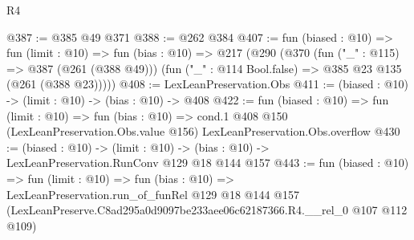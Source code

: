 \begin{lexlean}{R4}
\begin{coremodule}
@387 := @385 @49 @371
@388 := @262 @384
@407 := fun (biased : @10) =>
  fun (limit : @10) =>
  fun (bias : @10) =>
  @217
    (@290
      (@370
        (fun ("_" : @115) => @387 (@261 (@388 @49)))
        (fun ("_" : @114 Bool.false) => @385 @23 @135 (@261 (@388 @23)))))
@408 := LexLeanPreservation.Obs
@411 := (biased : @10) -> (limit : @10) -> (bias : @10) -> @408
@422 := fun (biased : @10) =>
  fun (limit : @10) =>
  fun (bias : @10) =>
  cond.{1} @408 @150 (LexLeanPreservation.Obs.value @156) LexLeanPreservation.Obs.overflow
@430 := (biased : @10) ->
  (limit : @10) -> (bias : @10) -> LexLeanPreservation.RunConv @129 @18 @144 @157
@443 := fun (biased : @10) =>
  fun (limit : @10) =>
  fun (bias : @10) =>
  LexLeanPreservation.run_of_funRel
    @129
    @18
    @144
    @157
    (LexLeanPreserve.C8ad295a0d9097be233aee06c62187366.R4.__rel_0 @107 @112 @109)
\end{coremodule}
\end{lexlean}
